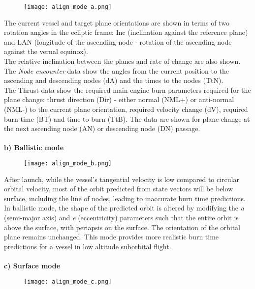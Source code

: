 \documentclass[Orbiter User Manual.tex]{subfiles}
\begin{document}
\begin{figure}[H]
  \centering
  \texttt{[image: align\_mode\_a.png]}
\end{figure}

\noindent
The current vessel and target plane orientations are shown in terms of two rotation angles in the ecliptic frame: Inc (inclination against the reference plane) and LAN (longitude of the ascending node - rotation of the ascending node against the vernal equinox).\\
The relative inclination between the planes and rate of change are also shown.\\
The \textit{Node encounter} data show the angles from the current position to the ascending and descending nodes (dA) and the times to the nodes (TtN).\\
The Thrust data show the required main engine burn parameters required for the plane change: thrust direction (Dir) - either normal (NML+) or anti-normal (NML-) to the current plane orientation, required velocity change (dV), required burn time (BT) and time to burn (TtB). The data are shown for plane change at the next ascending node (AN) or descending node (DN) passage.\\
\\
\textbf{b) Ballistic mode}

\begin{figure}[H]
  \centering
  \texttt{[image: align\_mode\_b.png]}
\end{figure}

\noindent
After launch, while the vessel's tangential velocity is low compared to circular orbital velocity, most of the orbit predicted from state vectors will be below surface, including the line of nodes, leading to inaccurate burn time predictions. In ballistic mode, the shape of the predicted orbit is altered by modifying the \textit{a} (semi-major axis) and \textit{e} (eccentricity) parameters such that the entire orbit is above the surface, with periapsis on the surface. The orientation of the orbital plane remains unchanged. This mode provides more realistic burn time predictions for a vessel in low altitude suborbital flight.\\
\\
\textbf{c) Surface mode}

\begin{figure}[H]
  \centering
  \texttt{[image: align\_mode\_c.png]}
\end{figure}
\end{document}
